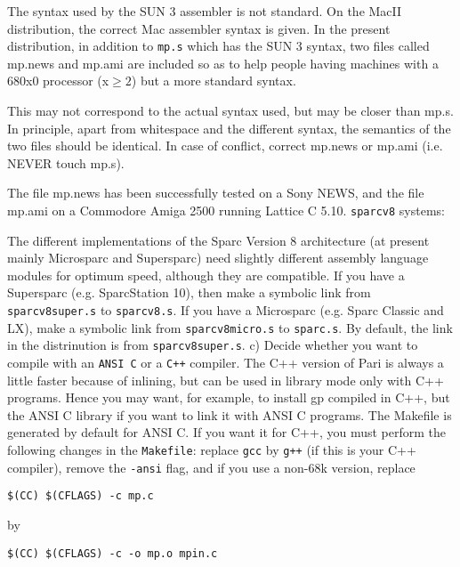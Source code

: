    The syntax used by the SUN 3 assembler is not standard. On the MacII 
   distribution, the correct Mac assembler syntax is given. In the present
   distribution, in addition to {\tt mp.s} which has the SUN 3 syntax, two 
   files called mp.news and mp.ami are included so as to help people having 
   machines with a 680x0 processor (x$\ge2$) but a more standard syntax.

   This may not correspond to the actual syntax used, but may be closer than
   mp.s. In principle, apart from whitespace and the different syntax, the 
   semantics of the two files should be identical. In case of conflict, 
   correct mp.news or mp.ami (i.e. NEVER touch mp.s).

   The file mp.news has been successfully tested on a Sony NEWS, and the file
   mp.ami on a Commodore Amiga 2500 running Lattice C 5.10.
\smallskip
{\tt sparcv8} systems:

   The different implementations of the Sparc Version 8 architecture (at 
   present mainly Microsparc and Supersparc) need slightly different assembly
   language modules for optimum speed, although they are compatible.
   If you have a Supersparc (e.g. SparcStation 10), then make a symbolic
   link from {\tt sparcv8super.s} to {\tt sparcv8.s}. If you have a Microsparc
   (e.g. Sparc Classic and LX), make a symbolic link from {\tt sparcv8micro.s}
   to {\tt sparc.s}. By default, the link in the distrinution is from 
   {\tt sparcv8super.s}.
\medskip
   c) Decide whether you want to compile with an {\tt ANSI C} or a {\tt C++}
      compiler. The C++ version of Pari is always a little faster
      because of inlining, but can be used in library mode only with C++ 
      programs. Hence you may want,
      for example, to install gp compiled in C++, but the ANSI C library if
      you want to link it with ANSI C programs.
      The Makefile is generated by default for ANSI C. If you want it for C++,
      you must perform the following changes in the {\tt Makefile}: replace
      {\tt gcc} by {\tt g++} (if this is your C++ compiler), remove the 
      {\tt -ansi} flag, and if you use a non-68k version, replace 

\centerline{\tt \$(CC) \$(CFLAGS) -c mp.c} 

by

\centerline{\tt \$(CC) \$(CFLAGS) -c -o mp.o mpin.c}


